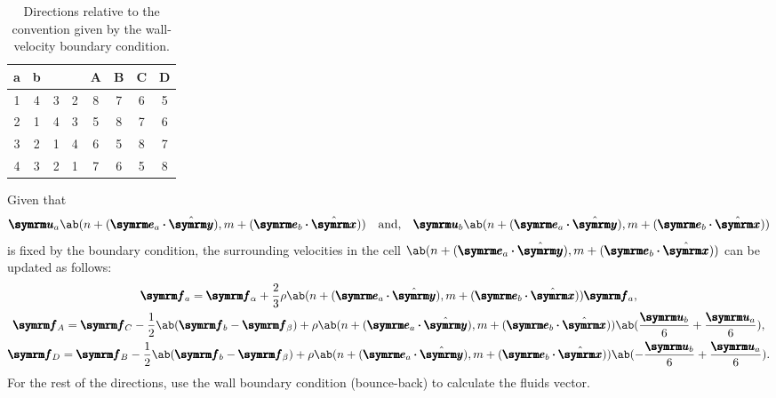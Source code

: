 \begin{table}[ht]
	\centering
	\begin{tabular}{C C | C C C C C C}
		a & b & \alpha & \beta & A & B & C & D \\
		 & 4 & 3      & 2     & 8 & 7 & 6 & 5 \\
		2 & 1 & 4      & 3     & 5 & 8 & 7 & 6 \\
		3 & 2 & 1      & 4     & 6 & 5 & 8 & 7 \\
		4 & 3 & 2      & 1     & 7 & 6 & 5 & 8
	\end{tabular}
	\caption{Directions relative to the convention given by the wall-velocity boundary condition.}
	\label{tab:relative-direction}
\end{table}

Given that
\begin{equation}
	\vv{u}_a\ab(n + (\vv{e}_a\vdot\yhat), m + (\vv{e}_b\vdot\xhat)) \mathand \vv{u}_b\ab(n + (\vv{e}_a\vdot\yhat), m + (\vv{e}_b\vdot\xhat))
\end{equation}
is fixed by the boundary condition, the surrounding velocities in the cell $\ab(n + (\vv{e}_a\vdot\yhat), m + (\vv{e}_b\vdot\xhat))$ can be updated as follows: \cite{zou-1997}
\begin{gather}
	\vv{f}_a = \vv{f}_{\alpha} + \frac{2}{3}\rho\ab(n + (\vv{e}_a\vdot\yhat), m + (\vv{e}_b\vdot\xhat))\vv{f}_a, \\
	\vv{f}_A = \vv{f}_{C} - \frac{1}{2}\ab(\vv{f}_b - \vv{f}_{\beta}) + \rho\ab(n + (\vv{e}_a\vdot\yhat), m + (\vv{e}_b\vdot\xhat))\ab(\frac{\vv{u}_b}{6} + \frac{\vv{u}_a}{6}), \\
	\vv{f}_D = \vv{f}_{B} - \frac{1}{2}\ab(\vv{f}_b - \vv{f}_{\beta}) + \rho\ab(n + (\vv{e}_a\vdot\yhat), m + (\vv{e}_b\vdot\xhat))\ab(- \frac{\vv{u}_b}{6} + \frac{\vv{u}_a}{6}).
\end{gather}
For the rest of the directions, use the wall boundary condition (bounce-back) to calculate the fluids vector.
